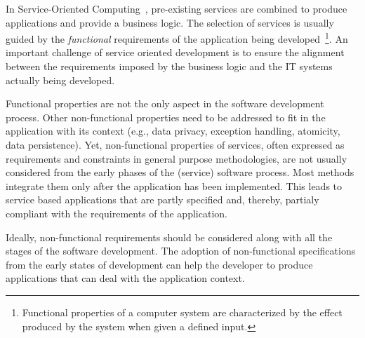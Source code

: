 




In Service-Oriented Computing~\cite{Papazoglou2007}, pre-existing services are
combined to produce applications and provide a business logic.
The selection of services is usually guided by the \textit{functional} requirements of the application being developed~\cite{1,2,decastro1,PapazoglouH06}\footnote{Functional properties of a computer system are characterized by the effect produced by the system when given a defined input.}.
An important challenge of service oriented development is  to ensure the alignment between the requirements imposed by the business logic and the IT systems actually being developed.

Functional properties are not the only  aspect in the software development process.
Other non-functional properties need to be addressed to fit in the application with its context (e.g., data privacy, exception handling, atomicity, data persistence).
Yet, non-functional properties of  services, often expressed as requirements and constraints in general purpose methodologies, are not usually considered from the early phases of the (service) software process.
Most methods integrate them only after the application has been implemented.
This leads to service based applications that are partly specified and, thereby, partialy compliant with the requirements of the application.

Ideally, non-functional requirements should be considered along with all the stages of the software development.
The adoption of non-functional specifications from the early states of development
can help the developer to produce applications that  can deal with
the application context.


